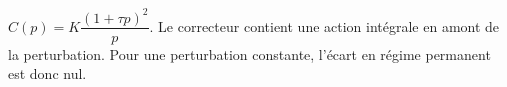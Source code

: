 \ifprof
\begin{corrige}
$C(p)=K\dfrac{\left(1+\tau p\right)^2}{p}$. Le correcteur contient une action intégrale en amont de la perturbation. Pour une perturbation constante, l'écart en régime permanent est donc nul.
\end{corrige}
\else
\fi
%
%
%
%
%
%
%
%
%
